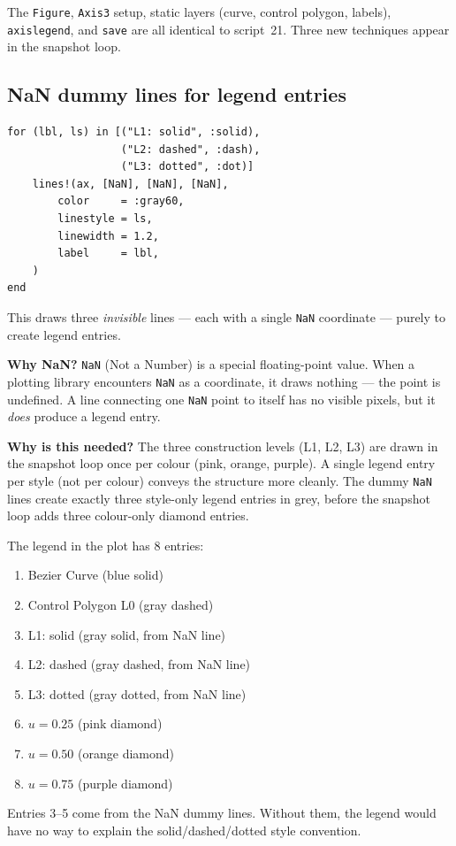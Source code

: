 \documentclass[12pt, a4paper]{article}
\newcommand{\cd}[1]{\texttt{#1}}
\begin{document}
The \cd{Figure}, \cd{Axis3} setup, static layers (curve,
control polygon, labels), \cd{axislegend}, and \cd{save}
are all identical to script~21.
Three new techniques appear in the snapshot loop.

\subsection{NaN dummy lines for legend entries}

\begin{verbatim}
for (lbl, ls) in [("L1: solid", :solid),
                  ("L2: dashed", :dash),
                  ("L3: dotted", :dot)]
    lines!(ax, [NaN], [NaN], [NaN],
        color     = :gray60,
        linestyle = ls,
        linewidth = 1.2,
        label     = lbl,
    )
end
\end{verbatim}

This draws three \emph{invisible} lines --- each with a
single \cd{NaN} coordinate --- purely to create legend entries.

\textbf{Why NaN?}
\cd{NaN} (Not a Number) is a special floating-point value.
When a plotting library encounters \cd{NaN} as a coordinate,
it draws nothing --- the point is undefined.
A line connecting one \cd{NaN} point to itself has no
visible pixels, but it \emph{does} produce a legend entry.

\textbf{Why is this needed?}
The three construction levels (L1, L2, L3) are drawn in
the snapshot loop once per colour (pink, orange, purple).
A single legend entry per style (not per colour) conveys
the structure more cleanly.
The dummy \cd{NaN} lines create exactly three style-only
legend entries in grey, before the snapshot loop adds
three colour-only diamond entries.

\begin{examplebox}
The legend in the plot has 8 entries:
\begin{enumerate}
  \item Bezier Curve (blue solid)
  \item Control Polygon L0 (gray dashed)
  \item L1: solid (gray solid, from NaN line)
  \item L2: dashed (gray dashed, from NaN line)
  \item L3: dotted (gray dotted, from NaN line)
  \item $u=0.25$ (pink diamond)
  \item $u=0.50$ (orange diamond)
  \item $u=0.75$ (purple diamond)
\end{enumerate}
Entries 3--5 come from the NaN dummy lines.
Without them, the legend would have no way to explain
the solid/dashed/dotted style convention.
\end{examplebox}
\end{document}
